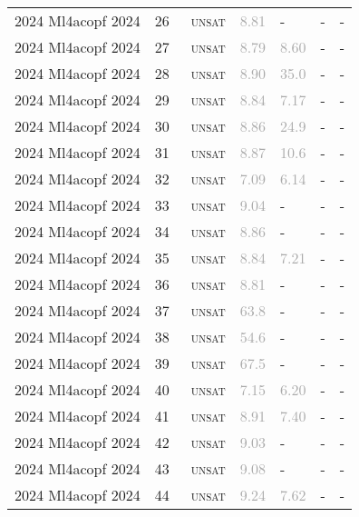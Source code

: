 \begin{center}
{\begin{longtable}{@{}lllllll@{}}
2024 Ml4acopf 2024 & 26 & ~\textsc{unsat} & \textcolor{darkgray}{8.81} & - & - & - \\
2024 Ml4acopf 2024 & 27 & ~\textsc{unsat} & \textcolor{darkgray}{8.79} & \textcolor{darkgray}{8.60} & - & - \\
2024 Ml4acopf 2024 & 28 & ~\textsc{unsat} & \textcolor{darkgray}{8.90} & \textcolor{darkgray}{35.0} & - & - \\
2024 Ml4acopf 2024 & 29 & ~\textsc{unsat} & \textcolor{darkgray}{8.84} & \textcolor{darkgray}{7.17} & - & - \\
2024 Ml4acopf 2024 & 30 & ~\textsc{unsat} & \textcolor{darkgray}{8.86} & \textcolor{darkgray}{24.9} & - & - \\
2024 Ml4acopf 2024 & 31 & ~\textsc{unsat} & \textcolor{darkgray}{8.87} & \textcolor{darkgray}{10.6} & - & - \\
2024 Ml4acopf 2024 & 32 & ~\textsc{unsat} & \textcolor{darkgray}{7.09} & \textcolor{darkgray}{6.14} & - & - \\
2024 Ml4acopf 2024 & 33 & ~\textsc{unsat} & \textcolor{darkgray}{9.04} & - & - & - \\
2024 Ml4acopf 2024 & 34 & ~\textsc{unsat} & \textcolor{darkgray}{8.86} & - & - & - \\
2024 Ml4acopf 2024 & 35 & ~\textsc{unsat} & \textcolor{darkgray}{8.84} & \textcolor{darkgray}{7.21} & - & - \\
2024 Ml4acopf 2024 & 36 & ~\textsc{unsat} & \textcolor{darkgray}{8.81} & - & - & - \\
2024 Ml4acopf 2024 & 37 & ~\textsc{unsat} & \textcolor{darkgray}{63.8} & - & - & - \\
2024 Ml4acopf 2024 & 38 & ~\textsc{unsat} & \textcolor{darkgray}{54.6} & - & - & - \\
2024 Ml4acopf 2024 & 39 & ~\textsc{unsat} & \textcolor{darkgray}{67.5} & - & - & - \\
2024 Ml4acopf 2024 & 40 & ~\textsc{unsat} & \textcolor{darkgray}{7.15} & \textcolor{darkgray}{6.20} & - & - \\
2024 Ml4acopf 2024 & 41 & ~\textsc{unsat} & \textcolor{darkgray}{8.91} & \textcolor{darkgray}{7.40} & - & - \\
2024 Ml4acopf 2024 & 42 & ~\textsc{unsat} & \textcolor{darkgray}{9.03} & - & - & - \\
2024 Ml4acopf 2024 & 43 & ~\textsc{unsat} & \textcolor{darkgray}{9.08} & - & - & - \\
2024 Ml4acopf 2024 & 44 & ~\textsc{unsat} & \textcolor{darkgray}{9.24} & \textcolor{darkgray}{7.62} & - & - \\

\end{longtable}}
\end{center}
